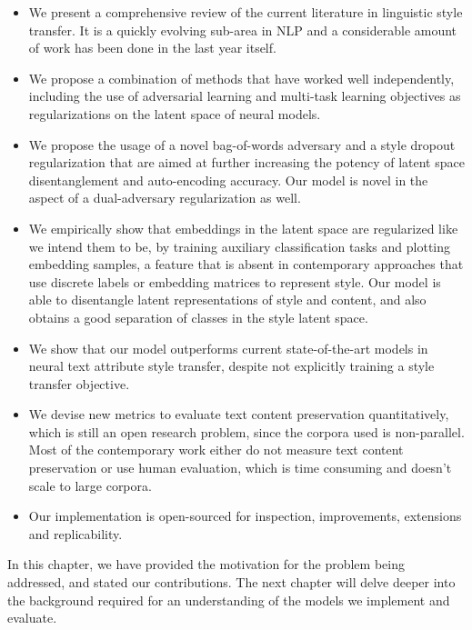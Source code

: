 \begin{itemize}
	\item We present a comprehensive review of the current literature in linguistic style transfer. It is a quickly evolving sub-area in NLP and a considerable amount of work has been done in the last year itself.
	\item We propose a combination of methods that have worked well independently, including the use of adversarial learning and multi-task learning objectives as regularizations on the latent space of neural models.
	\item We propose the usage of a novel bag-of-words adversary and a style dropout regularization that are aimed at further increasing the potency of latent space disentanglement and auto-encoding accuracy. Our model is novel in the aspect of a dual-adversary regularization as well.
	\item We empirically show that embeddings in the latent space are regularized like we intend them to be, by training auxiliary classification tasks and plotting embedding samples, a feature that is absent in contemporary approaches that use discrete labels or embedding matrices to represent style. Our model is able to disentangle latent representations of style and content, and also obtains a good separation of classes in the style latent space.
	\item We show that our model outperforms current state-of-the-art models in neural text attribute style transfer, despite not explicitly training a style transfer objective.
	\item We devise new metrics to evaluate text content preservation quantitatively, which is still an open research problem, since the corpora used is non-parallel. Most of the contemporary work either do not measure text content preservation or use human evaluation, which is time consuming and doesn't scale to large corpora.
	\item Our implementation is open-sourced for inspection, improvements, extensions and replicability.
\end{itemize}


In this chapter, we have provided the motivation for the problem being addressed, and stated our contributions. The next chapter will delve deeper into the background required for an understanding of the models we implement and evaluate.
